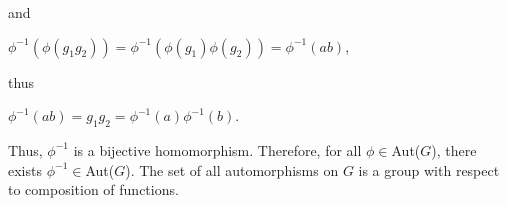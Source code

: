 \documentclass[12pt, a4paper]{article}
\begin{document}
\begin{description}
    and
    
\vspace{4mm}

        \centerline{$\phi^{-1}(\phi(g_1g_2))=\phi^{-1}(\phi(g_1)\phi(g_2))=\phi^{-1}(ab)$,}
        
\vspace{4mm}

    thus
    
\vspace{4mm}

        \centerline{$\phi^{-1}(ab)=g_1g_2=\phi^{-1}(a)\phi^{-1}(b)$.}
        
\vspace{4mm}

    Thus, $\phi^{-1}$ is a bijective homomorphism. Therefore, for all $\phi\in$Aut($G$), there exists $\phi^{-1}\in$Aut($G$). The set of all automorphisms on $G$ is a group with respect to composition of functions.
    
\end{description}
\end{document}
